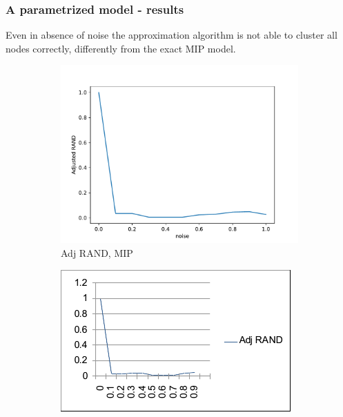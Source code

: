 \documentclass{beamer}
\begin{document}
\begin{frame}[c]
	\frametitle{A parametrized model - results}

	Even in absence of noise the approximation algorithm is not able to cluster all
	nodes correctly, differently from the exact MIP model.

	\begin{figure}
		\begin{center}
			\begin{subfigure}[b]{0.3\textwidth}
				\centering
				\includegraphics[width=\textwidth]{out/synthetic_exact/model2_noise_adj_rand.pdf}
				\caption{Adj RAND, MIP}
				\label{fig:out/synthetic_exact/model2_sigmas_adj_rand.pdf}
			\end{subfigure}
			\begin{subfigure}[b]{0.3\textwidth}
				\centering
				\includegraphics[width=\textwidth]{out/synthetic_approximation/adj.png}

\end{subfigure}
\end{center}
\end{figure}
\end{frame}
\end{document}
